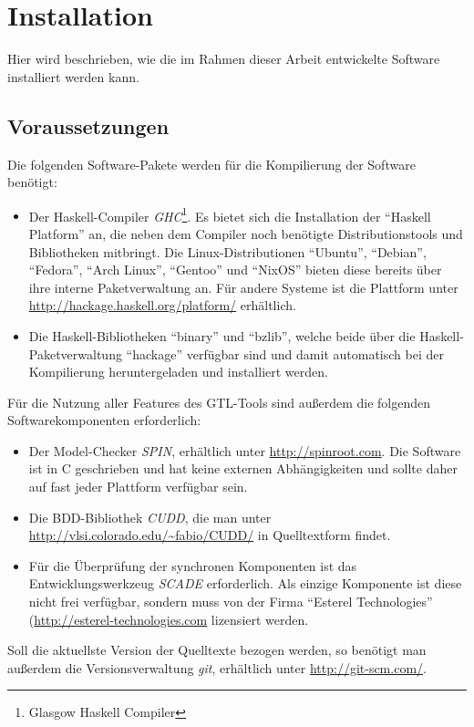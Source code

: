 \chapter{Installation}
Hier wird beschrieben, wie die im Rahmen dieser Arbeit entwickelte Software installiert werden kann.
\section{Voraussetzungen}
Die folgenden Software-Pakete werden für die Kompilierung der Software benötigt:
\begin{itemize}
\item Der Haskell-Compiler \emph{GHC}\footnote{Glasgow Haskell Compiler}.
  Es bietet sich die Installation der "`Haskell Platform"' an, die neben dem Compiler noch benötigte Distributionstools und Bibliotheken mitbringt.
  Die Linux-Distributionen "`Ubuntu"', "`Debian"', "`Fedora"', "`Arch Linux"', "`Gentoo"' und "`NixOS"' bieten diese bereits über ihre interne Paketverwaltung an.
  Für andere Systeme ist die Plattform unter \url{http://hackage.haskell.org/platform/} erhältlich.
\item Die Haskell-Bibliotheken "`binary"' und "`bzlib"', welche beide über die Haskell-Pa\-ket\-ver\-wal\-tung "`hackage"' verfügbar sind und damit automatisch bei der Kompilierung heruntergeladen und installiert werden.
\end{itemize}
Für die Nutzung aller Features des GTL-Tools sind außerdem die folgenden Softwarekomponenten erforderlich:
\begin{itemize}
\item Der Model-Checker \emph{SPIN}, erhältlich unter \url{http://spinroot.com}.
  Die Software ist in C geschrieben und hat keine externen Abhängigkeiten und sollte daher auf fast jeder Plattform verfügbar sein.
\item Die BDD-Bibliothek \emph{CUDD}, die man unter \url{http://vlsi.colorado.edu/~fabio/CUDD/} in Quelltextform findet.
\item Für die Überprüfung der synchronen Komponenten ist das Entwicklungswerkzeug \emph{SCADE} erforderlich.
  Als einzige Komponente ist diese nicht frei verfügbar, sondern muss von der Firma "`Esterel Technologies"' (\url{http://esterel-technologies.com} lizensiert werden.
\end{itemize}
Soll die aktuellste Version der Quelltexte bezogen werden, so benötigt man außerdem die Versionsverwaltung \emph{git}, erhältlich unter \url{http://git-scm.com/}.
